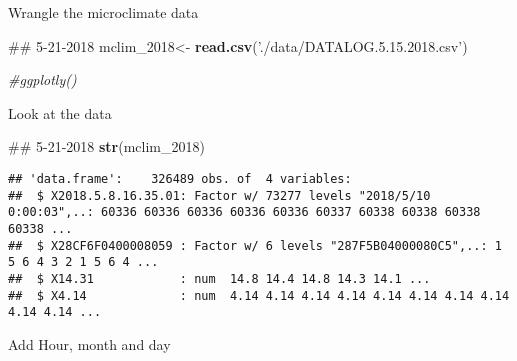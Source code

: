 \documentclass[]{book}
\newenvironment{Shaded}{\begin{snugshade}}{\end{snugshade}}
\newcommand{\KeywordTok}[1]{\textcolor[rgb]{0.13,0.29,0.53}{\textbf{#1}}}
\newcommand{\DecValTok}[1]{\textcolor[rgb]{0.00,0.00,0.81}{#1}}
\newcommand{\StringTok}[1]{\textcolor[rgb]{0.31,0.60,0.02}{#1}}
\newcommand{\CommentTok}[1]{\textcolor[rgb]{0.56,0.35,0.01}{\textit{#1}}}
\newcommand{\OperatorTok}[1]{\textcolor[rgb]{0.81,0.36,0.00}{\textbf{#1}}}
\newcommand{\NormalTok}[1]{#1}
\theoremstyle{definition}
\theoremstyle{definition}
\theoremstyle{definition}
\theoremstyle{remark}
\begin{document}
Wrangle the microclimate data

\begin{Shaded}
\begin{Highlighting}[]
\NormalTok{## 5-21-2018}
\NormalTok{mclim_}\DecValTok{2018}\NormalTok{<-}\StringTok{ }\KeywordTok{read.csv}\NormalTok{(}\StringTok{'./data/DATALOG.5.15.2018.csv'}\NormalTok{)}

\CommentTok{#ggplotly()}
\end{Highlighting}
\end{Shaded}

Look at the data

\begin{Shaded}
\begin{Highlighting}[]
\NormalTok{## 5-21-2018}
\KeywordTok{str}\NormalTok{(mclim_}\DecValTok{2018}\NormalTok{)}
\end{Highlighting}
\end{Shaded}

\begin{verbatim}
## 'data.frame':    326489 obs. of  4 variables:
##  $ X2018.5.8.16.35.01: Factor w/ 73277 levels "2018/5/10 0:00:03",..: 60336 60336 60336 60336 60336 60337 60338 60338 60338 60338 ...
##  $ X28CF6F0400008059 : Factor w/ 6 levels "287F5B04000080C5",..: 1 5 6 4 3 2 1 5 6 4 ...
##  $ X14.31            : num  14.8 14.4 14.8 14.3 14.1 ...
##  $ X4.14             : num  4.14 4.14 4.14 4.14 4.14 4.14 4.14 4.14 4.14 4.14 ...
\end{verbatim}

\begin{Shaded}
\end{Shaded}

Add Hour, month and day

\begin{Shaded}
\end{Shaded}
\end{document}
